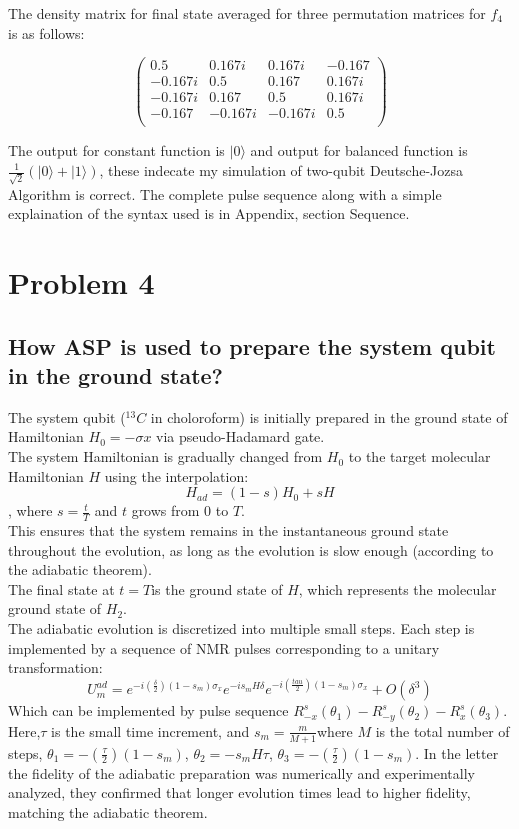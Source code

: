 \documentclass[11pt]{article}
\begin{document}
The density matrix for final state averaged for three permutation matrices for $f_4$ is as follows:

\[
\begin{pmatrix}
0.5 & 0.167i & 0.167i & -0.167 \\
-0.167i & 0.5 & 0.167 & 0.167i \\
-0.167i & 0.167 & 0.5 & 0.167i \\
-0.167 & -0.167i & -0.167i & 0.5 \\
\end{pmatrix}
\]

The output for constant function is $|0\rangle$ and output for balanced function is $\frac{1}{\sqrt{2}}(|0\rangle+|1\rangle)$, these indecate my simulation of two-qubit Deutsche-Jozsa Algorithm is correct. The complete pulse sequence along with a simple explaination of the syntax used is in Appendix, section Sequence.

\section*{Problem 4}

\subsection*{How ASP is used to prepare the system qubit in the ground state?}
The system qubit (${}^{13}C$ in choloroform) is initially prepared in the ground state of Hamiltonian $H_0 = -\sigma x$ via pseudo-Hadamard gate. \\

The system Hamiltonian is gradually changed from $H_0$ to the target molecular Hamiltonian $H$ using the interpolation:
\[ H_{ad} = (1-s)H_0 + sH\], where $s = \frac{t}{T}$ and $t$ grows from 0 to $T$. \\
This ensures that the system remains in the instantaneous ground state throughout the evolution, as long as the evolution is slow enough (according to the adiabatic theorem).\\
The final state at $t = T$is the ground state of $H$, which represents the molecular ground state of $H_2$.\\
The adiabatic evolution is discretized into multiple small steps. Each step is implemented by a sequence of NMR pulses corresponding to a unitary transformation:
\[U^{ad}_{m} = e^{-i(\frac{\delta}{2})(1-s_m)\sigma_x}e^{-is_mH\delta}e^{-i(\frac{tau}{2})(1 - s_m)\sigma_x} + O(\delta^3)\]
Which can be implemented by pulse sequence $R^s_{-x}(\theta_1) - R^s_{-y}(\theta_2) - R^s_{x}(\theta_3)$.
Here,$\tau$ is the small time increment, and $s_m = \frac{m}{M+1}$where $M$ is the total number of steps, $\theta_1 = -(\frac{\tau}{2})(1-s_m)$, $\theta_2 = -s_mH\tau$, $\theta_3 = -(\frac{\tau}{2})(1-s_m)$. In the letter the fidelity of the adiabatic preparation was numerically and experimentally analyzed, they confirmed that longer evolution times lead to higher fidelity, matching the adiabatic theorem.
\end{document}
